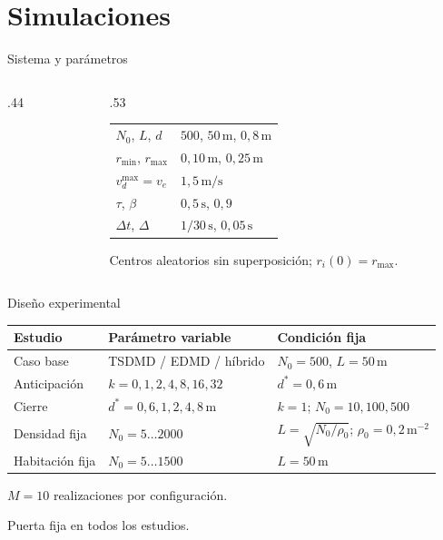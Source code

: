 \documentclass[aspectratio=169,20pt]{beamer}
\newcommand{\un}[1]{\,\mathrm{#1}}
\newcommand{\notaBreve}[1]{{\fontsize{18}{22}\selectfont #1}}
\begin{document}
\section{Simulaciones}
\begin{frame}{Sistema y parámetros}
\begin{columns}[c]
\begin{column}{.44\textwidth}\centering
{}
\end{column}
\begin{column}{.53\textwidth}
\begin{tabular}{ll}\toprule
$N_0$, $L$, $d$&$500$, $50\un{m}$, $0{,}8\un{m}$\\
$r_{\min}$, $r_{\max}$&$0{,}10\un{m}$, $0{,}25\un{m}$\\
$v_d^{\max}=v_e$&$1{,}5\un{m/s}$\\
$\tau$, $\beta$&$0{,}5\un{s}$, $0{,}9$\\
$\Delta t$, $\Delta$&$1/30\un{s}$, $0{,}05\un{s}$\\\bottomrule
\end{tabular}
\par\notaBreve{Centros aleatorios sin superposición; $r_i(0)=r_{\max}$.}
\end{column}
\end{columns}
\end{frame}

\begin{frame}{Diseño experimental}
\begin{tabular}{lll}\toprule
Estudio & Parámetro variable & Condición fija\\\midrule
Caso base & TSDMD / EDMD / híbrido & $N_0=500$, $L=50\un{m}$\\[3mm]
Anticipación & $k=0,1,2,4,8,16,32$ & $d^*=0{,}6\un{m}$\\[3mm]
Cierre & $d^*=0{,}6,1,2,4,8\un{m}$ & $k=1$; $N_0=10,100,500$\\[3mm]
Densidad fija & $N_0=5\ldots2000$ & $L=\sqrt{N_0/\rho_0}$; $\rho_0=0{,}2\un{m^{-2}}$\\[3mm]
Habitación fija & $N_0=5\ldots1500$ & $L=50\un{m}$\\\bottomrule
\end{tabular}
\vfill
$M=10$ realizaciones por configuración.
\par\notaBreve{Puerta fija en todos los estudios.}
\end{frame}
\end{document}
